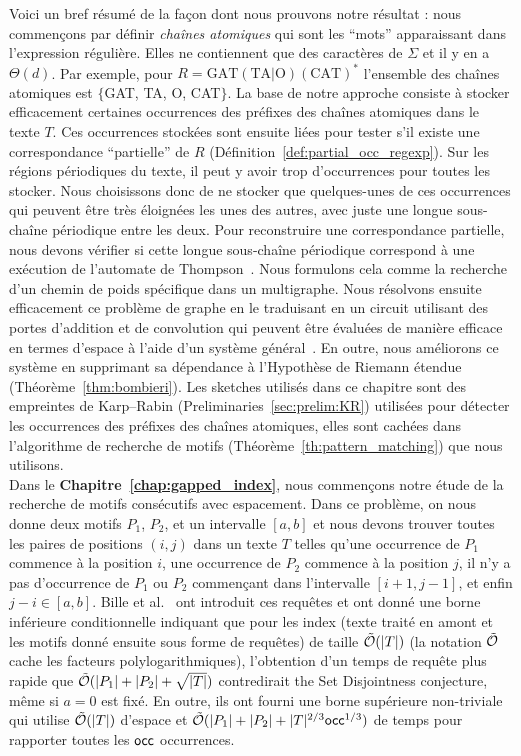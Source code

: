Voici un bref résumé de la façon dont nous prouvons notre résultat : nous commençons par définir \emph{chaînes atomiques} qui sont les ``mots'' apparaissant dans l'expression régulière. Elles ne contiennent que des caractères de $\Sigma$ et il y en a $\Theta(d)$. Par exemple, pour $R= \mathrm{GAT}(\mathrm{TA} | \mathrm{O})(\mathrm{CAT})^*$ l'ensemble des chaînes atomiques est $\{$GAT, TA, O, CAT$\}$.
%
La base de notre approche consiste à stocker efficacement certaines occurrences des préfixes des chaînes atomiques dans le texte $T$. Ces occurrences stockées sont ensuite liées pour tester s'il existe une correspondance ``partielle'' de $R$ (Définition~\ref*{def:partial_occ_regexp}).
Sur les régions périodiques du texte, il peut y avoir trop d'occurrences pour toutes les stocker.
Nous choisissons donc de ne stocker que quelques-unes de ces occurrences qui peuvent être très éloignées les unes des autres, avec juste une longue sous-chaîne périodique entre les deux. Pour reconstruire une correspondance partielle, nous devons vérifier si cette longue sous-chaîne périodique correspond à une exécution de l'automate de Thompson~\cite{Thompson_automaton}. Nous formulons cela comme la recherche d'un chemin de poids spécifique dans un multigraphe. Nous résolvons ensuite efficacement ce problème de graphe en le traduisant en un circuit utilisant des portes d'addition et de convolution qui peuvent être évaluées de manière efficace en termes d'espace à l'aide d'un système général~\cite{LokshtanovN10,Bringmann17}. En outre, nous améliorons ce système en supprimant sa dépendance à l'Hypothèse de Riemann étendue (Théorème~\ref{thm:bombieri}). 
%
Les sketches utilisés dans ce chapitre sont des empreintes de Karp--Rabin (Preliminaries~\ref{sec:prelim:KR}) utilisées pour détecter les occurrences des préfixes des chaînes atomiques, elles sont cachées dans l'algorithme de recherche de motifs (Théorème~\ref{th:pattern_matching}) que nous utilisons.\\

Dans le \textbf{Chapitre~\ref{chap:gapped_index}}, nous commençons notre étude de la recherche de motifs consécutifs avec espacement. Dans ce problème, on nous donne deux motifs $P_1$, $P_2$, et un intervalle $[a,b]$ et nous devons trouver toutes les paires de positions $(i,j)$ dans un texte $T$ telles qu'une occurrence de $P_1$ commence à la position $i$, une occurrence de $P_2$ commence à la position $j$, il n'y a pas d'occurrence de $P_1$ ou $P_2$ commençant dans l'intervalle $[i+1,j-1]$, et enfin $j-i \in [a,b]$.
%
Bille et al.~\cite{bille2022gapped} ont introduit ces requêtes et ont donné une borne inférieure conditionnelle indiquant que pour les index (texte traité en amont et les motifs donné ensuite sous forme de requêtes) de taille $\tilde {\mathcal{O}}(|T|)$ (la notation $\tilde {\mathcal{O}}$ cache les facteurs polylogarithmiques), l'obtention d'un temps de requête plus rapide que $\tilde {\mathcal{O}}(|P_1|+|P_2|+\sqrt{|T|})$ contredirait the Set Disjointness conjecture, même si $a=0$ est fixé. En outre, ils ont fourni une borne supérieure non-triviale qui utilise $\tilde {\mathcal{O}}(|T|)$ d'espace et $\tilde {\mathcal{O}} (|P_1| +|P_2| + |T|^{2/3}\mathsf{occ}^{1/3})$ de temps pour rapporter toutes les $\mathsf{occ}$ occurrences.


